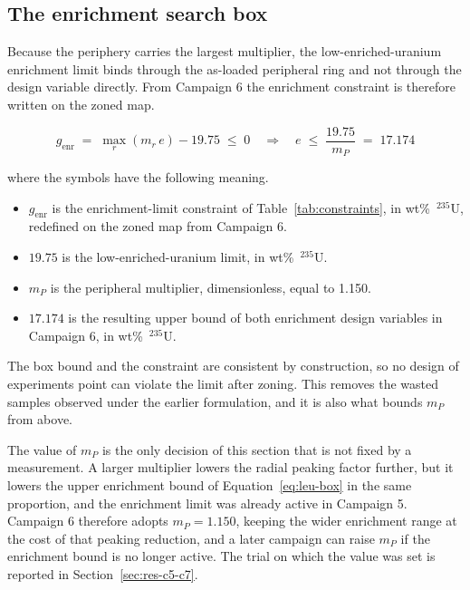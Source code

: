 \subsection{The enrichment search box}
\label{sec:meth-zoning-box}

Because the periphery carries the largest multiplier, the
low-enriched-uranium enrichment limit binds through the as-loaded peripheral ring
and not through the design variable directly. From Campaign 6 the
enrichment constraint is therefore written on the zoned map.

\begin{equation}
g_\mathrm{enr} \;=\; \max_r \left( m_r\, e \right) - 19.75 \;\le\; 0
\quad\Longrightarrow\quad
e \;\le\; \frac{19.75}{m_P} \;=\; 17.174
\label{eq:leu-box}
\end{equation}

\noindent where the symbols have the following meaning.

\begin{itemize}
  \item $g_\mathrm{enr}$ is the enrichment-limit constraint of
        Table~\ref{tab:constraints}, in wt\%~$^{235}$U, redefined on
        the zoned map from Campaign 6.

  \item $19.75$ is the low-enriched-uranium limit, in
        wt\%~$^{235}$U.

  \item $m_P$ is the peripheral multiplier, dimensionless, equal to
        1.150.

  \item $17.174$ is the resulting upper bound of both enrichment
        design variables in Campaign 6, in wt\%~$^{235}$U.
\end{itemize}

The box bound and the constraint are consistent by construction, so no
design of experiments point can violate the limit after zoning. This
removes the wasted samples observed under the earlier formulation, and
it is also what bounds $m_P$ from above.

The value of $m_P$ is the only decision of this section that is not
fixed by a measurement. A larger multiplier lowers the radial peaking
factor further, but it lowers the upper enrichment bound of
Equation~\eqref{eq:leu-box} in the same proportion, and the enrichment
limit was already active in Campaign 5. Campaign 6 therefore adopts
$m_P = 1.150$, keeping the wider enrichment range at the cost of that
peaking reduction, and a later campaign can raise $m_P$ if the
enrichment bound is no longer active. The trial on which the value was
set is reported in Section~\ref{sec:res-c5-c7}.

